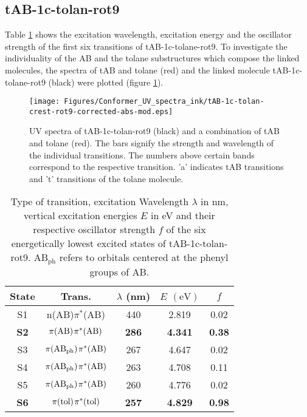 \subsection{tAB-1c-tolan-rot9}
%
Table \ref{tab:excited_states_tAB_1c_tolan} shows the excitation wavelength, excitation energy and the oscillator strength of the first six transitions of tAB-1c-tolane-rot9.
To investigate the individuality of the AB and the tolane substructures which compose the linked molecules, the spectra of tAB and tolane (red) and the linked molecule tAB-1c-tolane-rot9 (black) were plotted (figure \ref{fig:UV_spec_tAB-1c-tolan}).
%
%
\begin{figure}[H]
    \centering
    \texttt{[image: Figures/Conformer\_UV\_spectra\_ink/tAB-1c-tolan-crest-rot9-corrected-abs-mod.eps]}
    \caption{UV spectra of tAB-1c-tolan-rot9 (black) and a combination of tAB and tolane (red). The bars signify the strength and wavelength of the individual transitions. The numbers above certain bands correspond to the respective transition. 'a' indicates tAB transitions and 't' transitions of the tolane molecule.}
    \label{fig:UV_spec_tAB-1c-tolan}
\end{figure}
%
\begin{table}[ht]
  \caption{Type of transition, excitation Wavelength $\lambda$ in nm, vertical excitation energies $E$ in eV and their respective oscillator strength $f$ of the six energetically lowest excited states of tAB-1c-tolan-rot9. $\mathrm{AB_{ph}}$ refers to orbitals centered at the phenyl groups of AB.}
  \label{tab:excited_states_tAB_1c_tolan}
  \vspace{0.1 cm}
  \centering
  \begin{tabular}{ccccc}
  \toprule
  State & Trans. & $\lambda$ (nm)     & $E$ $\left(\si{\eV}\right)$          & $f$                 \\ \midrule
  S1 & n(AB)$\pi^{*}$(AB)  & 440   & 2.819 & 0.02                \\
  \textbf{S2}    & $\pi\mathrm{(AB)}\hspace{1 pt} \pi^{*}\mathrm{(AB)}$   & \textbf{286} & \textbf{4.341} & \textbf{0.38} \\
  S3    & $\pi\mathrm{(AB_{ph})}\hspace{1 pt} \pi^{*}\mathrm{(AB)}$& 267 & 4.647 & 0.02                \\
  S4    & $\pi\mathrm{(AB_{ph})} \hspace{1 pt} \pi^{*}\mathrm{(AB)}$& 263 & 4.708 & 0.11                \\
  S5    & $\pi\mathrm{(AB_{ph})} \hspace{1 pt} \pi^{*}\mathrm{(AB)}$& 260 & 4.776 & 0.02                \\
  \textbf{S6} & $\pi\mathrm{(tol)} \hspace{1 pt} \pi^{*}\mathrm{(tol)}$& \textbf{257} & \textbf{4.829} & \textbf{0.98}       \\ \bottomrule
  \end{tabular}
  \end{table}
